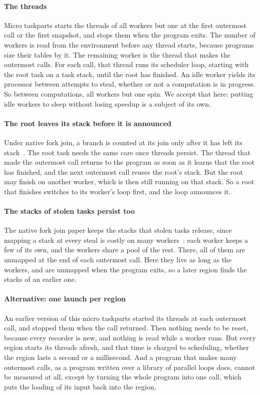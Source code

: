 \documentclass[sigplan,nonacm]{acmart}
\begin{document}
\paragraph{The threads}
%
Micro taskparts starts the threads of all workers but one at the first
outermost call or the first snapshot, and stops them when the program
exits.
%
The number of workers is read from the environment before any thread
starts, because programs size their tables by it.
%
The remaining worker is the thread that makes the outermost calls.
%
For each call, that thread runs its scheduler loop, starting with the
root task on a task stack, until the root has finished.
%
An idle worker yields its processor between attempts to steal, whether
or not a computation is in progress.
%
So between computations, all workers but one spin.
%
We accept that here: putting idle workers to sleep without losing
speedup is a subject of its own.

\paragraph{The root leaves its stack before it is announced}
%
Under native fork join, a branch is counted at its join only after it
has left its stack~\cite{nativeforkjoin}.
%
The root task needs the same care once threads persist.
%
The thread that made the outermost call returns to the program as soon
as it learns that the root has finished, and the next outermost call
reuses the root's stack.
%
But the root may finish on another worker, which is then still running
on that stack.
%
So a root that finishes switches to its worker's loop first, and the
loop announces it.

\paragraph{The stacks of stolen tasks persist too}
%
The native fork join paper keeps the stacks that stolen tasks
release, since mapping a stack at every steal is costly on many
workers~\cite{nativeforkjoin}: each worker keeps a few of its own, and
the workers share a pool of the rest.
%
There, all of them are unmapped at the end of each outermost call.
%
Here they live as long as the workers, and are unmapped when the
program exits, so a later region finds the stacks of an earlier one.

\paragraph{Alternative: one launch per region}
%
An earlier version of this micro taskparts started its threads at each
outermost call, and stopped them when the call returned.
%
Then nothing needs to be reset, because every recorder is new, and
nothing is read while a worker runs.
%
But every region starts its threads afresh, and that time is charged
to scheduling, whether the region lasts a second or a millisecond.
%
And a program that makes many outermost calls, as a program written
over a library of parallel loops does, cannot be measured at all,
except by turning the whole program into one call, which puts the
loading of its input back into the region.
\end{document}
